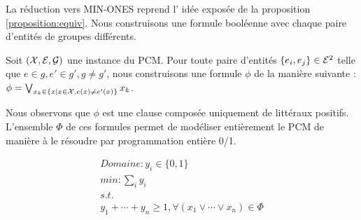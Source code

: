 \documentclass[a4paper,10pt]{article}
\begin{document}
La réduction vers MIN-ONES reprend l' idée exposée de la proposition \ref{proposition:equiv}. Nous construisons une formule booléenne avec chaque paire d'entités de groupes différents.

Soit $({\cal X}, {\cal E}, {\cal G})$ une instance du PCM.
Pour toute paire d'entités $\{e_i,e_j\}\in {\cal E}^2$ telle que $e\in g,e'\in
g',g\neq g'$, nous construisons une formule $\phi$ de la manière suivante :\\
$\phi=\bigvee_{x_k \in \{x|x \in {\cal X}, e(x) \neq e'(x)\}} x_k $.

Nous observons que $\phi$ est une clause composée uniquement de littéraux positifs. L'ensemble $\Phi$ de ces formules permet de modéliser entièrement le PCM de manière à le résoudre par programmation entière 0/1.

\begin{center}
\[\begin{array}{l}
Domaine : y_i \in \{0,1\}\\
min : \sum_i y_i\\
s.t.\\
  y_{1}+\cdots+y_{n} \geq 1, \forall(x_{1}\vee\cdots\vee x_{n}) \in
\Phi\\
\end{array}\]
\end{center}
\end{document}
